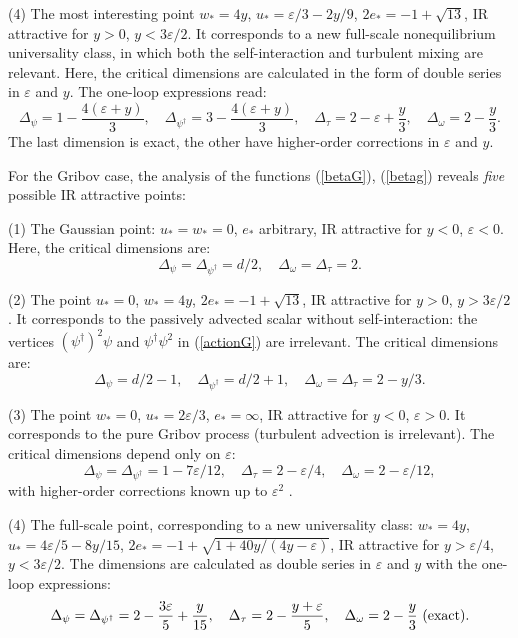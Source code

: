 \documentclass[12pt]{iopart}
\begin{document}
(4) The most interesting point $w_{*}=4y$, $u_{*}=\varepsilon/3-2y/9$,
$2e_{*}=-1+\sqrt{13}$, IR attractive for $y>0$, $y<3\varepsilon/2$. It
corresponds to a new full-scale nonequilibrium universality class, in
which both the self-interaction and turbulent mixing are relevant.
Here, the critical dimensions are calculated in the form of double series
in $\varepsilon$ and $y$. The one-loop expressions read:
\begin{equation}
\Delta_{\psi}=1- \frac{4(\varepsilon+y)}{3}, \quad
\Delta_{\psi^{\dag}}= 3 - \frac{4(\varepsilon+y)}{3}, \quad
\Delta_{\tau}=2-\varepsilon+ \frac{y}{3}, \quad
\Delta_{\omega}=2-\frac{y}{3}.
\label{dim4A}
\end{equation}
The last dimension is exact, the other have higher-order corrections
in $\varepsilon$ and $y$.

For the Gribov case, the analysis of the functions (\ref{betaG}),
(\ref{betag}) reveals {\it five}  possible IR attractive points:


(1) The Gaussian point: $u_{*}=w_{*}=0$, $e_{*}$ arbitrary, IR attractive
for $y<0$, $\varepsilon<0$. Here, the critical dimensions are:
\[ \Delta_{\psi}= \Delta_{\psi^{\dag}}=d/2, \quad
\Delta_{\omega}=\Delta_{\tau}=2. \]


(2) The point $u_{*}=0$,  $w_{*}=4y$,  $2e_{*} = -1+\sqrt{13}$,
IR attractive for $y>0$, $y>3\varepsilon/2$. It corresponds
to the passively advected scalar without self-interaction: the vertices
$(\psi^{\dagger})^2\psi$ and $\psi^{\dagger}\psi^2$ in (\ref{actionG})
are irrelevant. The critical dimensions are:
\[ \Delta_{\psi}=d/2-1, \quad  \Delta_{\psi^{\dag}}=d/2+1, \quad
\Delta_{\omega}=\Delta_{\tau}=2-y/3. \]

(3) The point $w_{*}=0$, $u_{*}=2\varepsilon/3$, $e_{*}=\infty$, IR
attractive for $y<0$, $\varepsilon>0$. It corresponds to the pure Gribov
process (turbulent advection is irrelevant). The critical
dimensions depend only on $\varepsilon$:
\begin{equation}
\Delta_{\psi}= \Delta_{\psi^{\dag}}= 1- 7\varepsilon/12, \quad
\Delta_{\tau}=2-\varepsilon/4, \quad
\Delta_{\omega}=2- \varepsilon/12,
\label{dim2G}
\end{equation}
with higher-order corrections known up to $\varepsilon^{2}$ \cite{JT}.


(4) The full-scale point, corresponding to a new universality class:
$w_{*}=4y$, $u_{*}=4\varepsilon/5-8y/15$,
$2e_{*}=-1+\sqrt{1+40y/(4y-\varepsilon)}$,
IR attractive for $y>\varepsilon/4$, $y<3\varepsilon/2$.
The dimensions are calculated as double series in $\varepsilon$ and $y$
with the one-loop expressions:
\begin{equation}
\Delta_{\psi}=\Delta_{\psi^{\dag}}=2-\frac{3\varepsilon}{5}+\frac{y}{15},
\quad
\Delta_{\tau}=2- \frac{y+\varepsilon}{5}, \quad
\Delta_{\omega}=2-\frac{y}{3}\ {\rm (exact)} .
\label{dim4G}
\end{equation}
\end{document}
